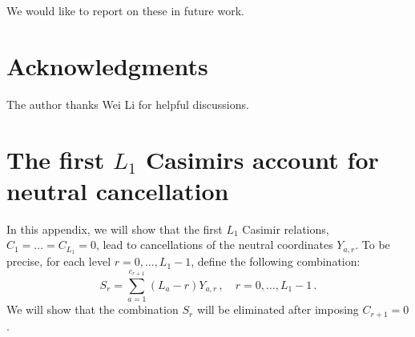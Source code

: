 \documentclass[12pt,a4paper]{article}
\begin{document}
We would like to report on these in future work.

\section*{Acknowledgments}
The author thanks Wei Li for helpful discussions.

\newpage
\appendix
\section{The first $L_1$ Casimirs account for neutral cancellation}
\label{appsec:neutral-cancel}
In this appendix, we will show that the first $L_1$ Casimir relations, $C_1=\dots=C_{L_1}=0$, lead to cancellations of the neutral coordinates $Y_{a,r}$. To be precise, for each level $r=0,\dots,L_1-1$, define the following combination:
\begin{equation}
 S_r=\sum_{a=1}^{c_{r+1}}(L_a-r)Y_{a,r}\,,\quad r=0,\dots,L_1-1\,.
 \label{eq:neutral-combination}
\end{equation}
We will show that the combination $S_r$ will be eliminated after imposing $C_{r+1}=0$.
\end{document}
